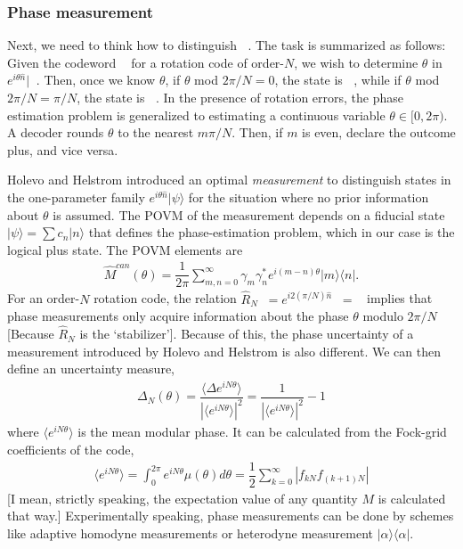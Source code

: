 \documentclass{article}
\DeclareMathOperator{\lgcplus}{|\bar{+}\rangle}
\DeclareMathOperator{\lgcminus}{|\bar{-}\rangle}
\DeclareMathOperator{\lgcpm}{|\bar{\pm}\rangle}
\begin{document}
\subsubsection{Phase measurement}\label{phase_measurement}
Next, we need to think how to distinguish $\lgcpm$. The task is summarized as follows: Given the codeword $\lgcplus$ for a rotation code of order-$N$, we wish to determine $\theta$ in $e^{i\theta\hat{n}}|\lgcplus$. Then, once we know $\theta$, if $\theta$ mod $2\pi/N=0$, the state is $\lgcplus$, while if $\theta$ mod $2\pi/N=\pi/N$, the state is $\lgcminus$. In the presence of rotation errors, the phase estimation problem is generalized to estimating a continuous variable $\theta \in [0, 2\pi)$. A decoder rounds $\theta$ to the nearest $m\pi/N$. Then, if $m$ is even, declare the outcome plus, and vice versa. 

Holevo and Helstrom introduced an optimal \textit{measurement} to distinguish states in the one-parameter family $e^{i\theta\hat{n}}|\psi\rangle$ for the situation where no prior information about $\theta$ is assumed. The POVM of the measurement depends on a fiducial state $|\psi\rangle=\sum c_n|n\rangle$ that defines the phase-estimation problem, which in our case is the logical plus state. The POVM elements are
\begin{align}
    \hat{M}^{can}(\theta)=\dfrac{1}{2\pi}\sum_{m,n=0}^{\infty}\gamma_m\gamma_n^*e^{i(m-n)\theta}|m\rangle\langle n|.
\end{align}
For an order-$N$ rotation code, the relation $\hat{R}_N\lgcplus=e^{i2(\pi/N)\hat{n}}\lgcplus=\lgcplus$ implies that phase measurements only acquire information about the phase $\theta$ modulo $2\pi/N$ [Because $\hat{R}_N$ is the `stabilizer']. Because of this, the phase uncertainty of a measurement introduced by Holevo and Helstrom is also different. We can then define an uncertainty measure,
\begin{align}
    \Delta_N(\theta)=\dfrac{\langle\Delta e^{iN\theta}\rangle}{|\langle e^{iN\theta}\rangle|^2}=\dfrac{1}{|\langle e^{iN\theta}\rangle|^2}-1
\end{align}
where $\langle e^{iN\theta}\rangle$ is the mean modular phase. It can be calculated from the Fock-grid coefficients of the code,
\begin{align}
    \langle e^{iN\theta}\rangle = \int_0^{2\pi}e^{iN\theta}\mu(\theta)d\theta = \dfrac{1}{2}\sum_{k=0}^\infty |f_{kN}f_{(k+1)N}|
\end{align}
[I mean, strictly speaking, the expectation value of any quantity $M$ is calculated that way.] Experimentally speaking, phase measurements can be done by schemes like adaptive homodyne measurements or heterodyne measurement $|\alpha\rangle\langle\alpha|$. 
\end{document}
